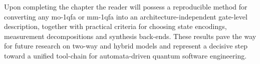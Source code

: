 \medskip
\noindent
Upon completing the chapter the reader will possess a reproducible method for converting any \gls{mo-1qfa} or \gls{mm-1qfa} into an architecture-independent gate-level description, together with practical criteria for choosing state encodings, measurement decompositions and synthesis back-ends.  These results pave the way for future research on two-way and hybrid models and represent a decisive step toward a unified tool-chain for automata-driven quantum software engineering.




